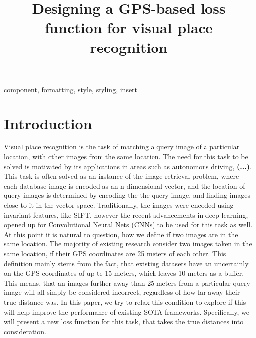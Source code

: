 \documentclass[conference]{IEEEtran}
\begin{document}
\title{Designing a GPS-based loss function for visual place recognition}

\author{
}

\maketitle

\begin{abstract}

\end{abstract}

\begin{IEEEkeywords}
component, formatting, style, styling, insert
\end{IEEEkeywords}

\section{Introduction}

Visual place recognition is the task of matching a query image of a particular location, with other images from the same location. The need for this task to be
solved is motivated by its applications in areas such as autonomous driving, \textbf{(...)}. This task is often solved as an instance of the image retrieval
problem, where each database image is encoded as an n-dimensional vector, and the location of query images is determined by encoding the the query image, and finding
images close to it in the vector space. Traditionally, the images were encoded using invariant features, like SIFT, however the recent advancements in deep learning, 
opened up for Convolutional Neural Nets (CNNs) to be used for this task as well. \\

At this point it is natural to question, how we define if two images are in the same location. The majority of existing research consider two images taken in the 
same location, if their GPS coordinates are 25 meters of each other. This definition mainly stems from the fact, that existing datasets have an uncertainly on 
the GPS coordinates of up to 15 meters, which leaves 10 meters as a buffer. This means, that an images further away than 25 meters from a particular query image 
will all simply be considered incorrect, regardless of how far away their true distance was. In this paper, we try to relax this condition to explore if this 
will help improve the performance of existing SOTA frameworks. Specifically, we will present a new loss function for this task, that takes the true distances into 
consideration.
\end{document}

